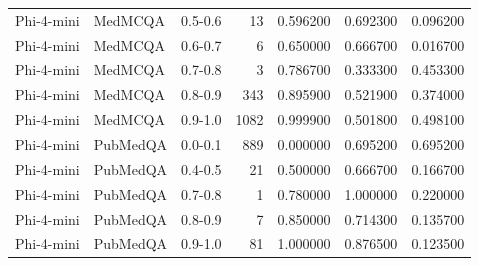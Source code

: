 \begin{tabular}{lllrrrr}
Phi-4-mini & MedMCQA & 0.5-0.6 & 13 & 0.596200 & 0.692300 & 0.096200 \\
Phi-4-mini & MedMCQA & 0.6-0.7 & 6 & 0.650000 & 0.666700 & 0.016700 \\
Phi-4-mini & MedMCQA & 0.7-0.8 & 3 & 0.786700 & 0.333300 & 0.453300 \\
Phi-4-mini & MedMCQA & 0.8-0.9 & 343 & 0.895900 & 0.521900 & 0.374000 \\
Phi-4-mini & MedMCQA & 0.9-1.0 & 1082 & 0.999900 & 0.501800 & 0.498100 \\
Phi-4-mini & PubMedQA & 0.0-0.1 & 889 & 0.000000 & 0.695200 & 0.695200 \\
Phi-4-mini & PubMedQA & 0.4-0.5 & 21 & 0.500000 & 0.666700 & 0.166700 \\
Phi-4-mini & PubMedQA & 0.7-0.8 & 1 & 0.780000 & 1.000000 & 0.220000 \\
Phi-4-mini & PubMedQA & 0.8-0.9 & 7 & 0.850000 & 0.714300 & 0.135700 \\
Phi-4-mini & PubMedQA & 0.9-1.0 & 81 & 1.000000 & 0.876500 & 0.123500 \\
\bottomrule
\end{tabular}

